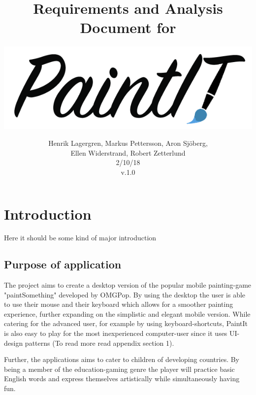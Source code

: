 \documentclass[12pt,a4paper]{scrartcl}
\title{Requirements and Analysis Document for }
\author{\includegraphics[width=\textwidth]{paintit.png} }
\date{Henrik Lagergren, Markus Pettersson, Aron Sj\"oberg, \\ Ellen Widerstrand, Robert Zetterlund \\ 2/10/18\\v.1.0}
\begin{document}
\maketitle
\thispagestyle{empty}

\newpage
\thispagestyle{empty}
\tableofcontents{}


\newpage

\section{Introduction}
Here it should be some kind of major introduction

\setcounter{page}{1}





\subsection{Purpose of application}
The project aims to create a desktop version of the popular mobile painting-game "paintSomething" developed by OMGPop. By using the desktop the user is able to use their mouse and their keyboard which allows for a smoother painting experience, further expanding on the simplistic and elegant mobile version. While catering for the advanced user, for example by using keyboard-shortcuts, PaintIt is also easy to play for the most inexperienced computer-user since it uses UI-design patterns (To read more read appendix section 1). 

Further, the applications aims to cater to children of developing countries. By being a member of the education-gaming genre the player will practice basic English words and express themselves artistically while simultaneously having fun.
\end{document}
